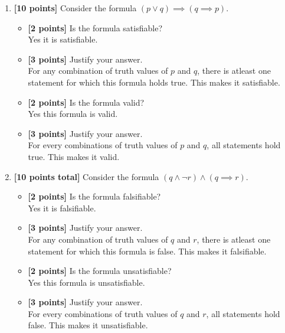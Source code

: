 \documentclass{article}
\begin{document}
\begin{enumerate}
\item \textbf{[10 points]} Consider the formula
  $(p \lor q) \implies (q \implies p)$.
  \begin{itemize}
  \item \textbf{[2 points]} Is the formula satisfiable?
  \\ Yes it is satisfiable.
  \item \textbf{[3 points]} Justify your answer.
  \\For any combination of truth values of $p$ and $q$, there is atleast one statement for which this formula holds true. This makes it satisfiable. 
  \item \textbf{[2 points]} Is the formula valid?
  \\Yes this formula is valid.
  \item \textbf{[3 points]} Justify your answer.
  \\For every combinations of truth values of $p$ and $q$, all statements hold true. This makes it valid.
  \end{itemize}

\item \textbf{[10 points total]} Consider the formula
  $(q \land \neg r) \land (q \implies r)$.
  \begin{itemize}
  \item \textbf{[2 points]} Is the formula falsifiable?
  \\ Yes it is falsifiable.
  \item \textbf{[3 points]} Justify your answer.
  \\For any combination of truth values of $q$ and $r$, there is atleast one statement for which this formula is false. This makes it falsifiable. 
  \item \textbf{[2 points]} Is the formula unsatisfiable?
  \\Yes this formula is unsatisfiable.
  \item \textbf{[3 points]} Justify your answer.
  \\For every combinations of truth values of $q$ and $r$, all statements hold false. This makes it unsatisfiable.
  \end{itemize}


\end{enumerate}
\end{document}
